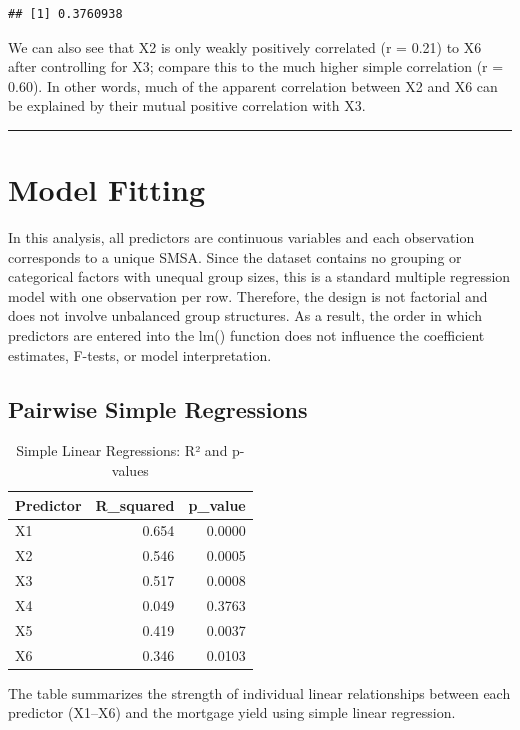 \documentclass[
  11pt,
]{article}
\begin{document}
\begin{verbatim}
## [1] 0.3760938
\end{verbatim}

We can also see that X2 is only weakly positively correlated (r = 0.21)
to X6 after controlling for X3; compare this to the much higher simple
correlation (r = 0.60). In other words, much of the apparent correlation
between X2 and X6 can be explained by their mutual positive correlation
with X3.

\begin{center}\rule{0.5\linewidth}{0.5pt}\end{center}

\section{Model Fitting}\label{model-fitting}

In this analysis, all predictors are continuous variables and each
observation corresponds to a unique SMSA. Since the dataset contains no
grouping or categorical factors with unequal group sizes, this is a
standard multiple regression model with one observation per row.
Therefore, the design is not factorial and does not involve unbalanced
group structures. As a result, the order in which predictors are entered
into the lm() function does not influence the coefficient estimates,
F-tests, or model interpretation.

\subsection{Pairwise Simple
Regressions}\label{pairwise-simple-regressions}

\begin{longtable}[t]{lrr}
\caption{\label{tab:unnamed-chunk-9}Simple Linear Regressions: R² and p-values}\\
\toprule
Predictor & R\_squared & p\_value\\
\midrule
X1 & 0.654 & 0.0000\\
X2 & 0.546 & 0.0005\\
X3 & 0.517 & 0.0008\\
X4 & 0.049 & 0.3763\\
X5 & 0.419 & 0.0037\\
\addlinespace
X6 & 0.346 & 0.0103\\
\bottomrule
\end{longtable}

The table summarizes the strength of individual linear relationships
between each predictor (X1--X6) and the mortgage yield using simple
linear regression.
\end{document}
